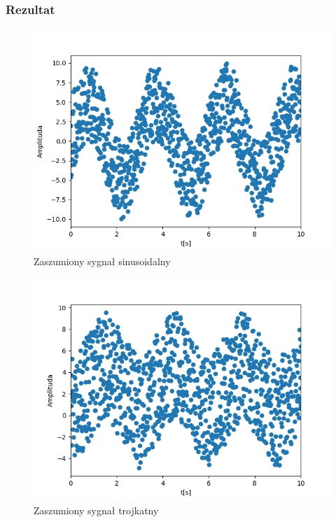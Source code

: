 \documentclass[12pt]{article}
\begin{document}
\subsubsection{Rezultat}
\begin{figure}[H]
\centering
\includegraphics[scale=0.6]{sinusSzum.png}
\caption{Zaszumiony sygnał sinusoidalny}
\end{figure}

\begin{figure}[H]
\centering
\includegraphics[scale=0.6]{trojkatSzum.png}
\caption{Zaszumiony sygnał trojkatny}
\end{figure}
\end{document}
